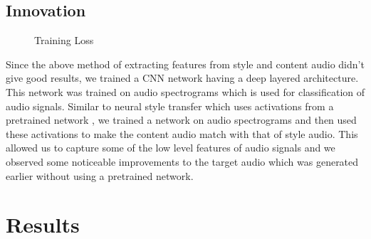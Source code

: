 \documentclass[10pt,twocolumn,letterpaper]{article}
\begin{document}
\subsection{Innovation}


\begin{figure}
\begin{center}
\end{center}
   \caption{Training Loss}
\label{fig:short}
\end{figure}

Since the above method of extracting features from style and content audio didn't give good results, we trained a CNN network having a deep layered architecture. This network was trained on audio spectrograms which is used for classification of audio signals. Similar to neural style transfer which uses activations from a pretrained network , we trained a network on audio spectrograms and then used these activations to make the content audio match with that of style audio. This allowed us to capture some of the low level features of audio signals and we observed some noticeable improvements to the target audio which was generated earlier without using a pretrained network.




\section{Results}
\end{document}
